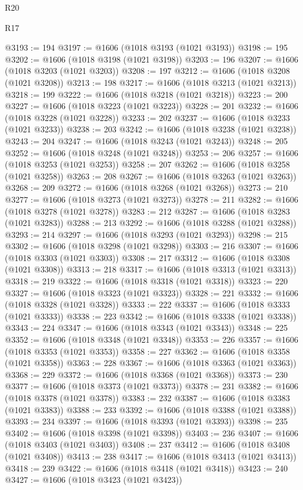 \begin{lexlean}{R20}
\begin{lexlean}{R17}
\begin{coremodule}
{{{{{{{{{{{{{{{{{{{{{{{{{{{{{{{{{{{{{{{{{{{{{{{{{{{{{{{{{{{{{{{{{{{{{{{{{{{{{{{{{{{{{{{{{{{{{{{{{{{{{{{{{{{@3193 := 194
@3197 := @1606 (@1018 @3193 (@1021 @3193))
@3198 := 195
@3202 := @1606 (@1018 @3198 (@1021 @3198))
@3203 := 196
@3207 := @1606 (@1018 @3203 (@1021 @3203))
@3208 := 197
@3212 := @1606 (@1018 @3208 (@1021 @3208))
@3213 := 198
@3217 := @1606 (@1018 @3213 (@1021 @3213))
@3218 := 199
@3222 := @1606 (@1018 @3218 (@1021 @3218))
@3223 := 200
@3227 := @1606 (@1018 @3223 (@1021 @3223))
@3228 := 201
@3232 := @1606 (@1018 @3228 (@1021 @3228))
@3233 := 202
@3237 := @1606 (@1018 @3233 (@1021 @3233))
@3238 := 203
@3242 := @1606 (@1018 @3238 (@1021 @3238))
@3243 := 204
@3247 := @1606 (@1018 @3243 (@1021 @3243))
@3248 := 205
@3252 := @1606 (@1018 @3248 (@1021 @3248))
@3253 := 206
@3257 := @1606 (@1018 @3253 (@1021 @3253))
@3258 := 207
@3262 := @1606 (@1018 @3258 (@1021 @3258))
@3263 := 208
@3267 := @1606 (@1018 @3263 (@1021 @3263))
@3268 := 209
@3272 := @1606 (@1018 @3268 (@1021 @3268))
@3273 := 210
@3277 := @1606 (@1018 @3273 (@1021 @3273))
@3278 := 211
@3282 := @1606 (@1018 @3278 (@1021 @3278))
@3283 := 212
@3287 := @1606 (@1018 @3283 (@1021 @3283))
@3288 := 213
@3292 := @1606 (@1018 @3288 (@1021 @3288))
@3293 := 214
@3297 := @1606 (@1018 @3293 (@1021 @3293))
@3298 := 215
@3302 := @1606 (@1018 @3298 (@1021 @3298))
@3303 := 216
@3307 := @1606 (@1018 @3303 (@1021 @3303))
@3308 := 217
@3312 := @1606 (@1018 @3308 (@1021 @3308))
@3313 := 218
@3317 := @1606 (@1018 @3313 (@1021 @3313))
@3318 := 219
@3322 := @1606 (@1018 @3318 (@1021 @3318))
@3323 := 220
@3327 := @1606 (@1018 @3323 (@1021 @3323))
@3328 := 221
@3332 := @1606 (@1018 @3328 (@1021 @3328))
@3333 := 222
@3337 := @1606 (@1018 @3333 (@1021 @3333))
@3338 := 223
@3342 := @1606 (@1018 @3338 (@1021 @3338))
@3343 := 224
@3347 := @1606 (@1018 @3343 (@1021 @3343))
@3348 := 225
@3352 := @1606 (@1018 @3348 (@1021 @3348))
@3353 := 226
@3357 := @1606 (@1018 @3353 (@1021 @3353))
@3358 := 227
@3362 := @1606 (@1018 @3358 (@1021 @3358))
@3363 := 228
@3367 := @1606 (@1018 @3363 (@1021 @3363))
@3368 := 229
@3372 := @1606 (@1018 @3368 (@1021 @3368))
@3373 := 230
@3377 := @1606 (@1018 @3373 (@1021 @3373))
@3378 := 231
@3382 := @1606 (@1018 @3378 (@1021 @3378))
@3383 := 232
@3387 := @1606 (@1018 @3383 (@1021 @3383))
@3388 := 233
@3392 := @1606 (@1018 @3388 (@1021 @3388))
@3393 := 234
@3397 := @1606 (@1018 @3393 (@1021 @3393))
@3398 := 235
@3402 := @1606 (@1018 @3398 (@1021 @3398))
@3403 := 236
@3407 := @1606 (@1018 @3403 (@1021 @3403))
@3408 := 237
@3412 := @1606 (@1018 @3408 (@1021 @3408))
@3413 := 238
@3417 := @1606 (@1018 @3413 (@1021 @3413))
@3418 := 239
@3422 := @1606 (@1018 @3418 (@1021 @3418))
@3423 := 240
@3427 := @1606 (@1018 @3423 (@1021 @3423))
}}}}}}}}}}}}}}}}}}}}}}}}}}}}}}}}}}}}}}}}}}}}}}}}}}}}}}}}}}}}}}}}}}}}}}}}}}}}}}}}}}}}}}}}}}}}}}}}}}}}}}}}}}}
\end{coremodule}
\end{lexlean}
\end{lexlean}
